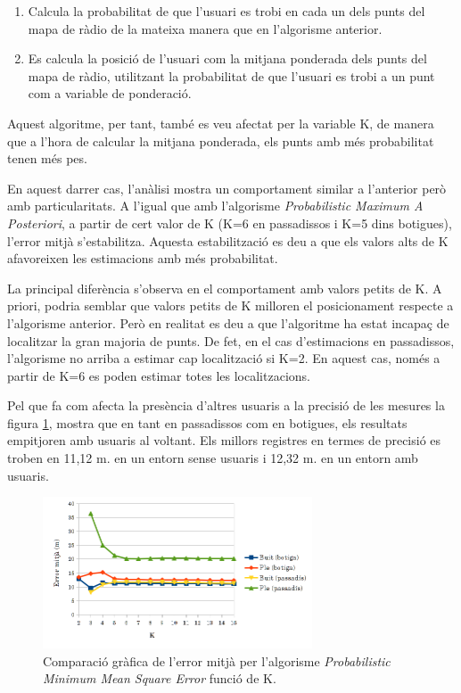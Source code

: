 \begin{enumerate}
    \item Calcula la probabilitat de que l'usuari es trobi en cada un dels punts del mapa de ràdio de la mateixa manera que en l'algorisme anterior.
    \item Es calcula la posició de l'usuari com la mitjana ponderada dels punts del mapa de ràdio, utilitzant la probabilitat de que l'usuari es trobi a un punt com a variable de ponderació.
\end{enumerate}

Aquest algoritme, per tant, també es veu afectat per la variable K, de manera que a l'hora de calcular la mitjana ponderada, els punts amb més probabilitat tenen més pes.

En aquest darrer cas, l'anàlisi mostra un comportament similar a l'anterior però amb particularitats. A l'igual que amb l'algorisme \textit{Probabilistic Maximum A Posteriori}, a partir de cert valor de K (K=6 en passadissos i K=5 dins botigues), l'error mitjà s'estabilitza. Aquesta estabilització es deu a que els valors alts de K afavoreixen les estimacions amb més probabilitat.

La principal diferència s'observa en el comportament amb valors petits de K. A priori, podria semblar que valors petits de K milloren el posicionament respecte a l'algorisme anterior. Però  en realitat es deu a que l'algoritme ha estat incapaç de localitzar la gran majoria de punts. De fet, en el cas d'estimacions en passadissos, l'algorisme no arriba a estimar cap localització si K=2. En aquest cas, només a partir de K=6 es poden estimar totes les localitzacions.

Pel que fa com afecta la presència d'altres usuaris a la precisió de les mesures la figura \ref{fig:grafic_mitja_MMSE}, mostra que en tant en passadissos com en botigues, els resultats empitjoren amb usuaris al voltant. Els millors registres en termes de precisió es troben en 11,12 m. en un entorn sense usuaris i 12,32 m. en un entorn amb usuaris.

\begin{figure}[ht]
\begin{center}
\includegraphics[width=8cm]{imatges/mmse_mitja.png}
\caption{Comparació gràfica de l'error mitjà per l'algorisme \textit{Probabilistic Minimum Mean Square Error} funció de K.}
\label{fig:grafic_mitja_MMSE}
\end{center}
\end{figure}

